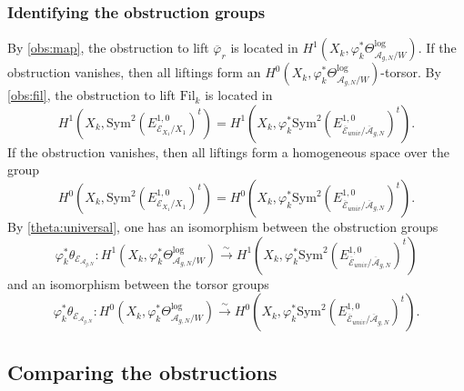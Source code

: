 \documentclass[12pt,twoside]{book}
\theoremstyle{plain}
\theoremstyle{definition}
\theoremstyle{remark}
\numberwithin{equation}{section}
\begin{document}
\subsubsection{Identifying the obstruction groups}
By \autoref{obs:map}, the obstruction to lift $\overline{\varphi}_r$ is located in $H^1(X_k,\varphi_k^* \Theta^{\log}_{{\mathcal A_{g,N}}/W})$.
If the obstruction vanishes, then all liftings form an $H^0(X_k,\varphi_k^* \Theta^{\log}_{{\mathcal A_{g,N}}/W})$-torsor.
By \autoref{obs:fil}, the obstruction to lift $\mathrm{Fil}_k$ is located in
\[H^1\left(X_k,\mathrm{Sym}^2 \left(E^{1,0}_{\mathcal E_{X_1}/X_1}\right)^t\right) = H^1\left(X_k,\varphi^*_k\mathrm{Sym}^2 \left(E^{1,0}_{\overline{\mathcal E}_{univ}/{\overline{\mathcal A}_{g,N}}}\right)^t\right).\]
If the obstruction vanishes, then all liftings form a homogeneous space over the group
\[H^0\left(X_k,\mathrm{Sym}^2 \left(E^{1,0}_{\mathcal E_{X_1}/X_1}\right)^t\right) = H^0\left(X_k,\varphi^*_k\mathrm{Sym}^2 \left(E^{1,0}_{\overline{\mathcal E}_{univ}/{\overline{\mathcal A}_{g,N}}}\right)^t\right).\]
By \eqref{theta:universal}, one has an isomorphism between the obstruction groups
\begin{equation}
\label{equ_ObsGroup1}
\varphi_k^*\theta_{\mathcal E_{{\mathcal A_{g,N}}}}\colon H^1(X_k,\varphi_k^* \Theta^{\log}_{{\mathcal A_{g,N}}/W}) \overset\sim\longrightarrow H^1\left(X_k,\varphi_k^* \mathrm{Sym}^2 \left(E^{1,0}_{\overline{\mathcal E}_{univ}/{\overline{\mathcal A}_{g,N}}}\right)^t\right)
\end{equation}
and an isomorphism between the torsor groups
\begin{equation}
\label{equ_ObsGroup2}
\varphi_k^*\theta_{\mathcal E_{{\mathcal A_{g,N}}}}\colon H^0(X_k,\varphi_k^* \Theta^{\log}_{{\mathcal A_{g,N}}/W}) \overset\sim\longrightarrow H^0\left(X_k,\varphi_k^* \mathrm{Sym}^2 \left(E^{1,0}_{\overline{\mathcal E}_{univ}/{\overline{\mathcal A}_{g,N}}}\right)^t\right).
\end{equation}

\subsection{Comparing the obstructions}
\end{document}
